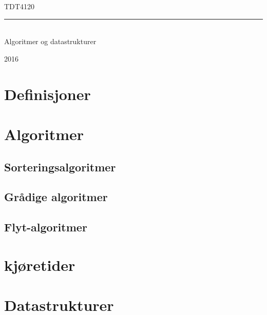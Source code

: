 \documentclass{article}
\begin{document}
\begin{center}
\vspace*{4.5cm}
\Huge{TDT4120}\\[2pc]
\vspace{-1.5cm}
\noindent\rule{11cm}{0.8pt}\\

\Huge{Algoritmer og datastrukturer}\\[1pc]
\vspace{3.5cm}

\Large{2016}\\
\end{center}

\setlength{\parindent}{4em}
\setlength{\parskip}{1em} %
\renewcommand{\baselinestretch}{1.3} %

\thispagestyle{empty}
\null
\newpage
\setcounter{page}{1}

\tableofcontents
\newpage

\setcounter{page}{1}







\section{Definisjoner}
\section{Algoritmer}
\subsection{Sorteringsalgoritmer}
\subsection{Grådige algoritmer}
\subsection{Flyt-algoritmer}
\section{kjøretider}
\section{Datastrukturer}
\end{document}
